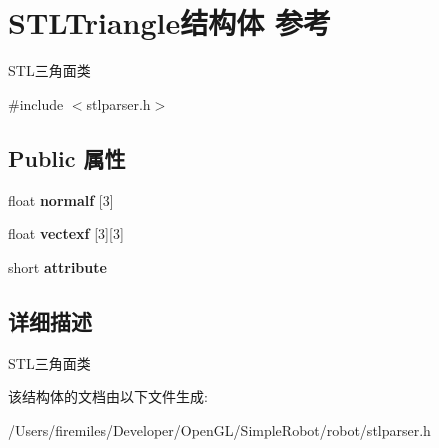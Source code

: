 \hypertarget{struct_s_t_l_triangle}{}\section{S\+T\+L\+Triangle结构体 参考}
\label{struct_s_t_l_triangle}


S\+T\+L三角面类  




{\ttfamily \#include $<$stlparser.\+h$>$}

\subsection*{Public 属性}
\begin{DoxyCompactItemize}
\item 
\hypertarget{struct_s_t_l_triangle_a4f39da57ad9dd1fa066d639948189606}{}float {\bfseries normalf} \mbox{[}3\mbox{]}\label{struct_s_t_l_triangle_a4f39da57ad9dd1fa066d639948189606}

\item 
\hypertarget{struct_s_t_l_triangle_abfcf2f7138257e8c28892e5a80724861}{}float {\bfseries vectexf} \mbox{[}3\mbox{]}\mbox{[}3\mbox{]}\label{struct_s_t_l_triangle_abfcf2f7138257e8c28892e5a80724861}

\item 
\hypertarget{struct_s_t_l_triangle_aacd20be52a2449627fcc38ad82a9dbeb}{}short {\bfseries attribute}\label{struct_s_t_l_triangle_aacd20be52a2449627fcc38ad82a9dbeb}

\end{DoxyCompactItemize}


\subsection{详细描述}
S\+T\+L三角面类 

该结构体的文档由以下文件生成\+:\begin{DoxyCompactItemize}
\item 
/\+Users/firemiles/\+Developer/\+Open\+G\+L/\+Simple\+Robot/robot/stlparser.\+h\end{DoxyCompactItemize}
